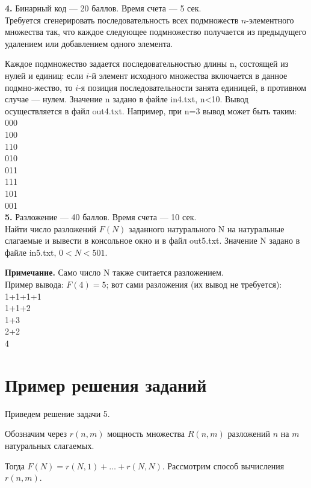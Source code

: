 \textbf{4.} Бинарный код --- 20 баллов. Время счета --- 5 сек.\\
Требуется сгенерировать последовательность всех подмножеств $n$-элементного множества так, что каждое следующее подмножество получается из предыдущего удалением или добавлением одного элемента.

Каждое подмножество задается последовательностью длины n, состоящей из нулей и единиц: если $i$-й элемент исходного множества включается в данное подмно-\linebreak жество, то $i$-я позиция последовательности занята единицей, в противном случае --- нулем.
Значение n задано в файле in4.txt, n<10. Вывод осуществляется в файл out4.txt. Например, при n=3 вывод может быть таким:\\
000\\
100\\
110\\
010\\
011\\
111\\
101\\
001\\



\textbf{5.} Разложение --- 40 баллов. Время счета --- 10 сек.\\
Найти число разложений $F(N)$ заданного натурального N на натуральные слагаемые и вывести в консольное окно и в файл out5.txt. Значение N задано в файле in5.txt, $0<N<501$.

\textbf{Примечание.} Само число N также считается разложением.\\
Пример вывода: $F(4)=5$; вот сами разложения (их вывод не требуется):\\
1+1+1+1\\
1+1+2\\
1+3\\
2+2\\
4\\




\section{Пример решения заданий}

Приведем решение задачи 5.

Обозначим через $r(n,m)$ мощность множества $R(n,m)$ разложений $n$ на $m$ натуральных слагаемых.

Тогда $F(N) = r(N,1)+…+r(N,N)$.
Рассмотрим способ вычисления $r(n,m)$.

